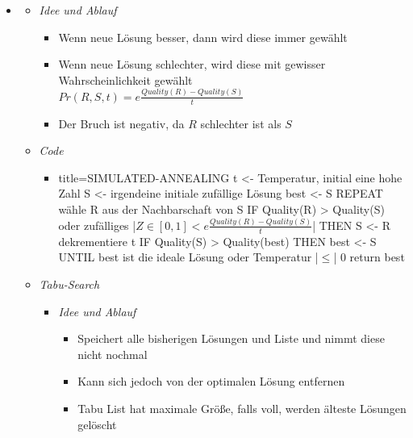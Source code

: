 \documentclass[
    12pt,
    a4paper,
    ngerman,
    color=3b,%
    marginpar=false,
    colorback=false,
    leqno,
]{tudaexercise}
\begin{document}
\begin{itemize}
\pagebreak

        \item {}
            \begin{itemize}
                \item \textit{Idee und Ablauf}
                    \begin{itemize}
                        \item Wenn neue Lösung besser, dann wird diese immer gewählt
                        \item Wenn neue Lösung schlechter, wird diese mit gewisser Wahrscheinlichkeit gewählt \\
                                $Pr(R,S,t) = e \frac{Quality(R)-Quality(S)}{t}$
                        \item Der Bruch ist negativ, da $R$ schlechter ist als $S$
                    \end{itemize}

                \item \textit{Code}
                    \begin{itemize}
                        \item[]
                            \begin{ccode}[autogobble,escapeinside=||]{title={SIMULATED-ANNEALING}}
                            t <- Temperatur, initial eine hohe Zahl
                            S <- irgendeine initiale zufällige Lösung
                            best <- S
                            REPEAT
                                wähle R aus der Nachbarschaft von S
                                IF Quality(R) > Quality(S) oder zufälliges
                                            |$ Z \in [0,1] < e \frac{Quality(R)-Quality(S)}{t}$| THEN
                                        S <- R
                                dekrementiere t
                                IF Quality(S) > Quality(best) THEN
                                    best <- S 
                            UNTIL best ist die ideale Lösung oder Temperatur |$\leq$| 0
                            return best
                            \end{ccode}
                    \end{itemize}

                \item \textit{Tabu-Search}
                    \begin{itemize}
                        \item \textit{Idee und Ablauf}
                            \begin{itemize}
                                \item Speichert alle bisherigen Lösungen und Liste und nimmt diese nicht nochmal
                                \item Kann sich jedoch von der optimalen Lösung entfernen
                                \item Tabu List hat maximale Grö\ss e, falls voll, werden älteste Lösungen gelöscht
                            \end{itemize}
                        

\end{itemize}
\end{itemize}
\end{itemize}
\end{document}
